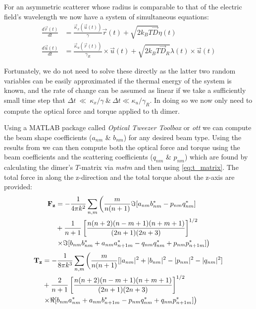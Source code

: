 For an asymmetric scatterer whose radius is comparable to that of the 
electric field's wavelength we now have a system of simultaneous equations:
\begin{align}
	\label{eq:full_langevin}
  \frac{{d}\vec{r}(t)}{{dt}}
  &=
    \frac{\vec{\kappa}_x(\vec{u}(t))}{\gamma}\vec{r}(t) + \sqrt{2k_BT\vec{D}}\eta(t)
  \\
  \frac{{d}\vec{u}(t)}{{dt}}
  &=
    \frac{\vec{\kappa}_u(\vec{r}(t))}{\gamma_R}\times \vec{u}(t)
    + \sqrt{2k_BT\vec{D}_R}\lambda(t)\times \vec{u}(t)
\end{align}

Fortunately, we do not need to solve these directly as the latter two
random variables can be easily approximated if the thermal energy of
the system is known, and the rate of change can be assumed as linear if
we take a sufficiently small time step that $\Delta t~\ll~\kappa_x/\gamma 
\ \& \ \Delta t \ll \kappa_u/\gamma_R$. In doing so we now only need 
to compute the optical force and torque applied to th dimer. 

Using a  MATLAB package called \textit{Optical Tweezer Toolbox} 
or \textit{ott} \cite{Nieminen2007} we can compute the beam 
shape coefficients ($a_{nm}$ \& $b_{nm}$) for any desired beam 
type. Using the results from \cite{Farsund1996} we can then 
compute both the optical force and torque using the beam 
coefficients and the scattering coefficients ($q_{nm}$ \& $p_{nm}$) 
which are found by calculating the dimer's $T$-matrix via \textit{mstm} 
\cite{Mackowski2011} and then using \eqref{eq:t_matrix}. The 
total force in along the z-direction and the total torque about 
the z-axis are provided:
\begin{equation}
	\label{eq:optical_force}
\begin{split}
  \bold{F_z}
  &=
    -\frac{1}{4\pi k^2}\sum_{n,m} \left(\frac{m}{n(n+1)}\Im[a_{nm}b^*_{nm}-p_{nm}q^*_{nm}] \right.
  \\ 
  &+\frac{1}{n+1}\left[\frac{n(n+2)(n-m+1)(n+m+1)}{(2n+1)(2n+3)} \right]^{1/2}
  \\
  & \left.\times\Im[b_{nm}b^*_{nm}+a_{nm}a^*_{n+1m}-q_{nm}q^*_{nm}+p_{nm}p^*_{n+1m}] \right)
\end{split}
\end{equation}
\begin{equation}
\begin{split}
  \bold{T_z}
  &=
    -\frac{1}{8\pi k^3}\sum_{n,m} \left(\frac{m}{n(n+1)}[|a_{nm}|^2+|b_{nm}|^2-|p_{nm}|^2-|q_{nm}|^2] \right.
  \\ 
  &+\frac{2}{n+1}\left[\frac{n(n+2)(n-m+1)(n+m+1)}{(2n+1)(2n+3)} \right]^{1/2}
  \\
  & \left.\times\Re[b_{nm}a^*_{nm}+a_{nm}b^*_{n+1m}-p_{nm}q^*_{nm}+q_{nm}p^*_{n+1m}] \right)
\end{split}
\end{equation}

